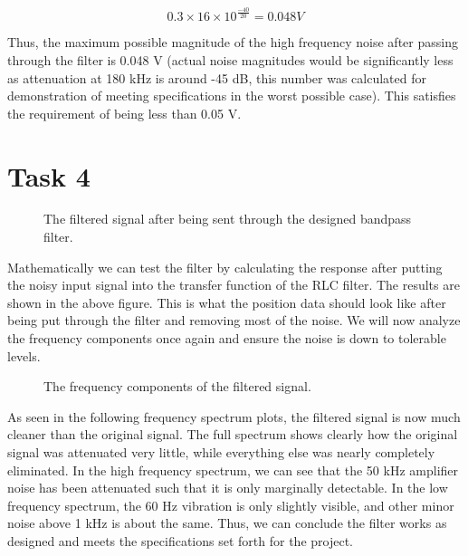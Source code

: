 \documentclass[12pt]{report}
\begin{document}
\[ 0.3\times 16 \times 10^{\frac{-40}{20}} = 0.048 V \]

Thus, the maximum possible magnitude of the high frequency noise after
passing through the filter is 0.048 V (actual noise magnitudes would be significantly less as attenuation at 180 kHz is around -45 dB, this number was calculated for demonstration of meeting specifications in the worst possible case). This satisfies the requirement of
being less than 0.05 V.

\pagebreak

\hypertarget{task-4-1}{%
\section{Task 4}\label{task-4-1}}

    \begin{figure}[h]
\begin{center}
\end{center}

\caption{The filtered signal after being sent through the designed bandpass filter.}
\end{figure}
    
    Mathematically we can test the filter by calculating the response after putting the noisy input signal into the transfer function of the RLC filter. The results are shown in the above figure. This is what the position data should look like after being put through the filter and removing most of the noise. We will now analyze the frequency components once again and ensure the noise is down to tolerable levels.
    
    \begin{figure}[h]
\begin{center}
\end{center}
\caption{The frequency components of the filtered signal.}
\end{figure}
    
    \pagebreak
    
As seen in the following frequency spectrum plots, the filtered signal is
now much cleaner than the original signal. The full spectrum shows
clearly how the original signal was attenuated very little, while
everything else was nearly completely eliminated. In the high frequency spectrum, we can see that the 50 kHz amplifier noise has been attenuated such that it is only marginally detectable. In the low frequency
spectrum, the 60 Hz vibration is only slightly visible, and other
minor noise above 1 kHz is about the same. Thus, we can conclude the filter works as designed and meets the specifications set forth for the project.
\end{document}
